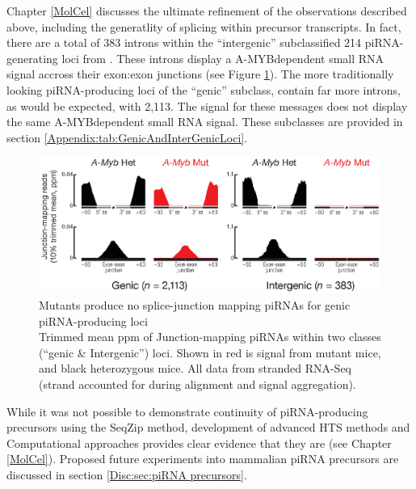   Chapter \ref{MolCel} discusses the ultimate refinement of the observations described above, including the generatlity of splicing within precursor transcripts. In fact, there are a total of 383 introns within the ``intergenic'' subclassified 214 piRNA-generating loci from \citep{Li2013e}. These introns display a A-MYB\textendash dependent small RNA signal accross their exon:exon junctions (see Figure \ref{SeqZipMethod:fig: amyb makes SJ mapping}). The more traditionally looking piRNA-producing loci of the ``genic'' subclass, contain far more introns, as would be expected, with 2,113. The signal for these messages does not display the same A-MYB\textendash dependent small RNA signal. These subclasses are provided in section \ref{Appendix:tab:GenicAndInterGenicLoci}. 

  \begin{figure} %
    \centering 
    \includegraphics{Figures/SeqZipMethod/aggregatePiRNAsatSpliceJunctions.eps}
    \caption[\amyb{} Mutants produce no splice-junction mapping piRNAs for genic piRNA-producing loci]
    {
      \amyb{} Mutants produce no splice-junction mapping piRNAs for genic piRNA-producing loci\\[0.25cm]
      Trimmed mean ppm of Junction-mapping piRNAs within two classes (``genic \& Intergenic'') loci. Shown in red is signal from \amyb{} mutant mice, and black \amyb{} heterozygous mice. All data from stranded RNA-Seq (strand accounted for during alignment and signal aggregation).
      }
    \label{SeqZipMethod:fig: amyb makes SJ mapping}
    \end{figure}

  While it was not possible to demonstrate continuity of piRNA-producing precursors using the SeqZip method, development of advanced HTS methods and Computational approaches provides clear evidence that they are (see Chapter \ref{MolCel}). Proposed future experiments into mammalian piRNA precursors are discussed in section \ref{Disc:sec:piRNA precursors}.











